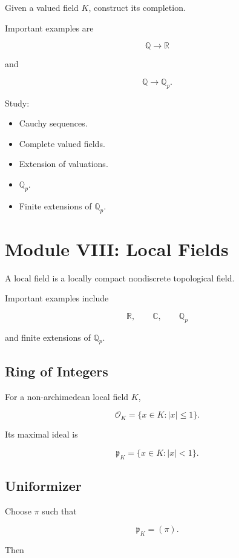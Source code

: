 \documentclass[11pt]{article}
\begin{document}
Given a valued field $K$, construct its completion.

Important examples are

\[
\mathbb{Q}
\longrightarrow
\mathbb{R}
\]

and

\[
\mathbb{Q}
\longrightarrow
\mathbb{Q}_p.
\]

Study:

\begin{itemize}
    \item Cauchy sequences.
    \item Complete valued fields.
    \item Extension of valuations.
    \item $\mathbb{Q}_p$.
    \item Finite extensions of $\mathbb{Q}_p$.
\end{itemize}

\section{Module VIII: Local Fields}

A local field is a locally compact nondiscrete topological field.

Important examples include

\[
\mathbb{R},\qquad
\mathbb{C},\qquad
\mathbb{Q}_p
\]

and finite extensions of $\mathbb{Q}_p$.

\subsection{Ring of Integers}

For a non-archimedean local field $K$,

\[
\mathcal{O}_K
=
\{x\in K:|x|\leq1\}.
\]

Its maximal ideal is

\[
\mathfrak{p}_K
=
\{x\in K:|x|<1\}.
\]

\subsection{Uniformizer}

Choose $\pi$ such that

\[
\mathfrak{p}_K=(\pi).
\]

Then
\end{document}
